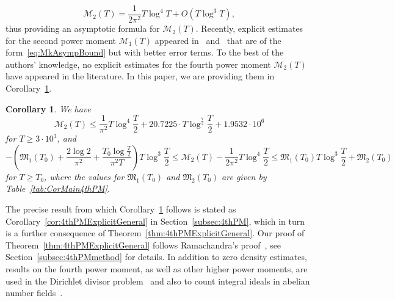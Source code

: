 \documentclass[a4paper,reqno]{amsart}
\newtheorem{corollary}{Corollary}
\theoremstyle{definition}
\begin{document}
\begin{equation}
\label{eq:4thPMGeneral}
\mathcal{M}_{2}(T) = \frac{1}{2\pi^2}T\log^{4}{T} + O\left(T\log^{3}{T}\right),
\end{equation}
thus providing an asymptotic formula for $\mathcal{M}_{2}(T)$. Recently, explicit estimates for the second power moment $\mathcal{M}_{1}(T)$ appeared in~\cite{DonaZunigaAlterman} and~\cite{SimonicStarichkova} that are of the form~\eqref{eq:MkAsympBound} but with better error terms. To the best of the authors' knowledge, no explicit estimates for the fourth power moment $\mathcal{M}_{2}(T)$ have appeared in the literature. In this paper, we are providing them in Corollary~\ref{cor:main4thPM}.

\begin{corollary}
\label{cor:main4thPM}
We have
\begin{equation}
\label{eq:main4thPM1}
\mathcal{M}_{2}(T) \leq \frac{1}{\pi^2}T\log^{4}{\frac{T}{2}} + 20.7225\cdot T\log^{\frac{7}{2}}{\frac{T}{2}} + 1.9532\cdot 10^6
\end{equation}
for $T\geq 3\cdot 10^3$, and
\begin{equation}
\label{eq:main4thPM2}
-\left(\mathfrak{M}_{1}(T_0)+\frac{2\log{2}}{\pi^2}+\frac{T_0\log{\frac{T}{2}}}{\pi^2 T}\right)T\log^{3}{\frac{T}{2}}\leq \mathcal{M}_{2}(T)-\frac{1}{2\pi^2}T\log^{4}{\frac{T}{2}} \leq \mathfrak{M}_{1}(T_0) T\log^{3}{\frac{T}{2}} + \mathfrak{M}_{2}(T_0)
\end{equation}
for $T\geq T_0$, where the values for $\mathfrak{M}_1(T_0)$ and $\mathfrak{M}_2(T_0)$ are given by Table~\ref{tab:CorMain4thPM}.
\end{corollary}

The precise result from which Corollary~\ref{cor:main4thPM} follows is stated as Corollary~\ref{cor:4thPMExplicitGeneral} in Section~\ref{subsec:4thPM}, which in turn is a further consequence of Theorem~\ref{thm:4thPMExplicitGeneral}. Our proof of Theorem~\ref{thm:4thPMExplicitGeneral} follows Ramachandra's proof~\cite{Ramachandra75}, see Section~\ref{subsec:4thPMmethod} for details. In addition to zero density estimates, results on the fourth power moment, as well as other higher power moments, are used in the Dirichlet divisor problem~\cite[Section~12.3]{titchmarsh1986theory} and also to count integral ideals in abelian number fields~\cite{languasco2025counting}.
\end{document}
